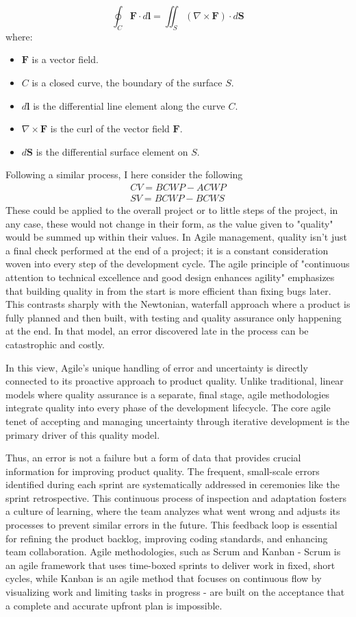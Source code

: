 \documentclass{article}
\begin{document}
$$
\oint_C \mathbf{F} \cdot d\mathbf{l} = \iint_S (\nabla \times \mathbf{F}) \cdot d\mathbf{S}
$$
\medskip
\noindent where:
\begin{itemize}
    \item $\mathbf{F}$ is a vector field.
    \item $C$ is a closed curve, the boundary of the surface $S$.
    \item $d\mathbf{l}$ is the differential line element along the curve $C$.
    \item $\nabla \times \mathbf{F}$ is the curl of the vector field $\mathbf{F}$.
    \item $d\mathbf{S}$ is the differential surface element on $S$.
\end{itemize}
Following a similar process, I here consider the following
\begin{align}
    CV = BCWP - ACWP\\
    SV = BCWP - BCWS
\end{align}
These could be applied to the overall project or to little steps of the project, in any case, these would not change in their form, as the value given to "quality" would be summed up within their values. In Agile management, quality isn't just a final check performed at the end of a project; it is a constant consideration woven into every step of the development cycle. The agile principle of "continuous attention to technical excellence and good design enhances agility" emphasizes that building quality in from the start is more efficient than fixing bugs later. This contrasts sharply with the Newtonian, waterfall approach where a product is fully planned and then built, with testing and quality assurance only happening at the end. In that model, an error discovered late in the process can be catastrophic and costly. 

In this view, Agile's unique handling of error and uncertainty is directly connected to its proactive approach to product quality. Unlike traditional, linear models where quality assurance is a separate, final stage, agile methodologies integrate quality into every phase of the development lifecycle. The core agile tenet of accepting and managing uncertainty through iterative development is the primary driver of this quality model. 

Thus, an error is not a failure but a form of data that provides crucial information for improving product quality. The frequent, small-scale errors identified during each sprint are systematically addressed in ceremonies like the sprint retrospective. This continuous process of inspection and adaptation fosters a culture of learning, where the team analyzes what went wrong and adjusts its processes to prevent similar errors in the future. This feedback loop is essential for refining the product backlog, improving coding standards, and enhancing team collaboration. Agile methodologies, such as Scrum and Kanban - Scrum is an agile framework that uses time-boxed sprints to deliver work in fixed, short cycles, while Kanban is an agile method that focuses on continuous flow by visualizing work and limiting tasks in progress - are built on the acceptance that a complete and accurate upfront plan is impossible. 
\end{document}
